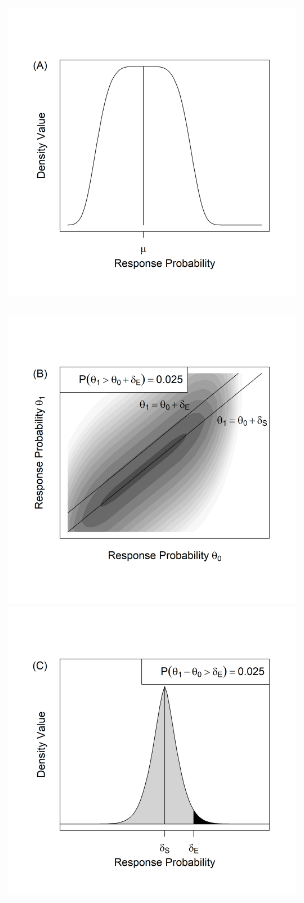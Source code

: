 \documentclass[12pt]{article}
\begin{document}
\begin{figure}\begin{center}
\includegraphics[width=3in]{./FIGURES/figure5c.png}

\includegraphics[width=3in]{./FIGURES/figure5a.png}
\includegraphics[width=3in]{./FIGURES/figure5d.png}


\end{center}
\end{figure}
\end{document}
